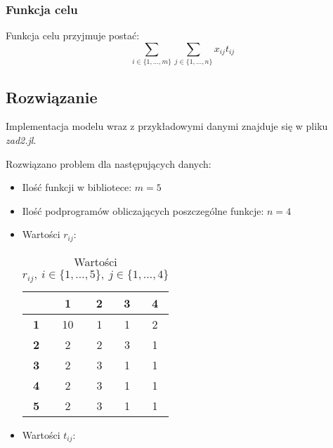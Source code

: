 \documentclass{article}
\begin{document}
    \subsubsection{Funkcja celu}

    Funkcja celu przyjmuje postać:
        $$\sum_{i \in \{1,\dots, m\}} \sum_{j \in \{1,\dots, n\}} x_{ij} t_{ij}$$

    \subsection{Rozwiązanie}

    Implementacja modelu wraz z przykładowymi danymi znajduje się w pliku \textit{zad2.jl}.

    Rozwiązano problem dla następujących danych:

    \begin{itemize}
        \item Ilość funkcji w bibliotece: $m = 5$
        \item Ilość podprogramów obliczających poszczególne funkcje: $n = 4$
        \item Wartości $r_{ij}$:
            \begin{table}[H]
                \begin{center}
                    \begin{tabular}{c||c|c|c|c}
                        & \textbf{1} & \textbf{2} & \textbf{3} & \textbf{4} \\ 
                        \hline
                        \hline
                        \textbf{1} & 10 & 1 & 1 & 2 \\
                        \hline
                        \textbf{2} & 2 & 2 & 3 & 1 \\
                        \hline
                        \textbf{3} & 2 & 3 & 1 & 1 \\
                        \hline
                        \textbf{4} & 2 & 3 & 1 & 1 \\
                        \hline
                        \textbf{5} & 2 & 3 & 1 & 1 \\
                    \end{tabular}
                    \caption{Wartości $r_{ij},\ i \in \{1, \dots, 5\},\ j \in \{1, \dots, 4\}$}
                    \label{tab2}
                \end{center}
            \end{table}
        \item Wartości $t_{ij}$:
            \begin{table}[H]

\end{table}
\end{itemize}
\end{document}

